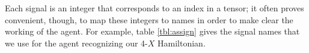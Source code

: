 \documentclass{amsbook}
\theoremstyle{plain}
\theoremstyle{definition}
\theoremstyle{remark}
\begin{document}
Each signal is an integer that corresponds to an index in a tensor;  it often proves convenient, though, to map these integers to names in order to make clear the working of the agent.  For example, table \ref{tbl:assign} gives the signal names that we use for the agent recognizing our 4-$X$ Hamiltonian.

\begin{table}



\end{table}
\end{document}
